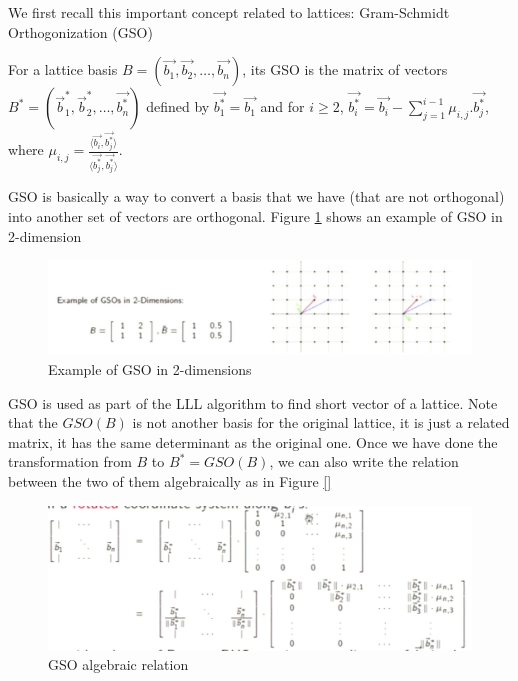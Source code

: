     We first recall this important concept related to lattices:
    Gram-Schmidt Orthogonization (GSO)
    \begin{definition}
        [GSO] For a lattice basis $B = \left( \vec{b_1}, \vec{b_2}, \dots,
        \vec{b_n} \right)$, its GSO is the matrix of vectors $B^* = \left(
            \vec{b}_1^*, \vec{b}_2^*, \dots, \vec{b_n^*}
        \right)$ defined by $\vec{b_1^*} = \vec{b_1}$ and for $i \geq 2$,
        $\vec{b_i^*} = \vec{b_i} - \sum_{j=1}^{i-1}{\mu_{i,j}.\vec{b_j^*}}$,
        where $\mu_{i,j} = \frac{\langle \vec{b_i}, \vec{b_j^*}
        \rangle}{\langle \vec{b_j^*},\vec{b_j^*} \rangle}$.
        \label{def:GSO}
    \end{definition}
    GSO is basically a way to convert a basis that we have (that are not
    orthogonal) into another set of vectors are orthogonal. Figure
    \ref{fig:gso} shows an example of GSO in
    2-dimension 
    \begin{figure}[h]
        \centering
        \includegraphics[scale=0.3]{gso}
        \caption{Example of GSO in 2-dimensions}
        \label{fig:gso}
    \end{figure}
    GSO is used as part of the LLL algorithm to find short vector of a lattice.
    Note that the $GSO(B)$ is not another basis for the original lattice, it is
    just a related matrix, it has the same determinant as the original one.
    Once we have done the transformation from $B$ to
    $B^* = GSO(B)$, we can also write the relation between the two of them
    algebraically as in Figure \ref{}
    \begin{figure}[h]
        \centering
        \includegraphics[scale=0.3]{gsoMatrix}
        \caption{GSO algebraic relation}
        \label{fig:GSOAlgebra}
    \end{figure}
